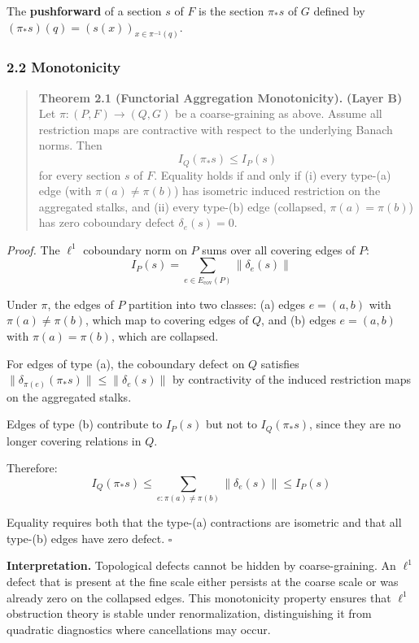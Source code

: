 \documentclass[
]{article}
\begin{document}
The \textbf{pushforward} of a section \(s\) of \(F\) is the section
\(\pi_* s\) of \(G\) defined by
\((\pi_* s)(q) = (s(x))_{x \in \pi^{-1}(q)}\).

\subsubsection{2.2 Monotonicity}\label{monotonicity}

\begin{quote}
\textbf{Theorem 2.1 (Functorial Aggregation Monotonicity).}
\textbf{(Layer B)} Let \(\pi: (P, F) \to (Q, G)\) be a coarse-graining
as above. Assume all restriction maps are contractive with respect to
the underlying Banach norms. Then \[I_Q(\pi_* s) \leq I_P(s)\] for every
section \(s\) of \(F\). Equality holds if and only if (i) every type-(a)
edge (with \(\pi(a) \neq \pi(b)\)) has isometric induced restriction on
the aggregated stalks, and (ii) every type-(b) edge (collapsed,
\(\pi(a) = \pi(b)\)) has zero coboundary defect \(\delta_e(s) = 0\).
\end{quote}

\emph{Proof.} The \(\ell^1\) coboundary norm on \(P\) sums over all
covering edges of \(P\):
\[I_P(s) = \sum_{e \in E_{\mathrm{cov}}(P)} \|\delta_e(s)\|\]

Under \(\pi\), the edges of \(P\) partition into two classes: (a) edges
\(e = (a, b)\) with \(\pi(a) \neq \pi(b)\), which map to covering edges
of \(Q\), and (b) edges \(e = (a, b)\) with \(\pi(a) = \pi(b)\), which
are collapsed.

For edges of type (a), the coboundary defect on \(Q\) satisfies
\(\|\delta_{\pi(e)}(\pi_* s)\| \leq \|\delta_e(s)\|\) by contractivity
of the induced restriction maps on the aggregated stalks.

Edges of type (b) contribute to \(I_P(s)\) but not to \(I_Q(\pi_* s)\),
since they are no longer covering relations in \(Q\).

Therefore:
\[I_Q(\pi_* s) \leq \sum_{e: \pi(a) \neq \pi(b)} \|\delta_e(s)\| \leq I_P(s)\]

Equality requires both that the type-(a) contractions are isometric and
that all type-(b) edges have zero defect. \(\square\)

\textbf{Interpretation.} Topological defects cannot be hidden by
coarse-graining. An \(\ell^1\) defect that is present at the fine scale
either persists at the coarse scale or was already zero on the collapsed
edges. This monotonicity property ensures that \(\ell^1\) obstruction
theory is stable under renormalization, distinguishing it from quadratic
diagnostics where cancellations may occur.
\end{document}

